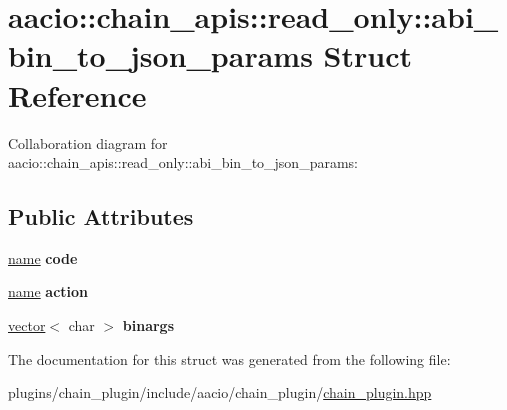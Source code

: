 \hypertarget{structaacio_1_1chain__apis_1_1read__only_1_1abi__bin__to__json__params}{}\section{aacio\+:\+:chain\+\_\+apis\+:\+:read\+\_\+only\+:\+:abi\+\_\+bin\+\_\+to\+\_\+json\+\_\+params Struct Reference}
\label{structaacio_1_1chain__apis_1_1read__only_1_1abi__bin__to__json__params}


Collaboration diagram for aacio\+:\+:chain\+\_\+apis\+:\+:read\+\_\+only\+:\+:abi\+\_\+bin\+\_\+to\+\_\+json\+\_\+params\+:
\subsection*{Public Attributes}
\begin{DoxyCompactItemize}
\item 
\mbox{\label{structaacio_1_1chain__apis_1_1read__only_1_1abi__bin__to__json__params_ab27c716024d1d07d033bdbcd528ec991}} 
\mbox{\hyperlink{structaacio_1_1name}{name}} {\bfseries code}
\item 
\mbox{\label{structaacio_1_1chain__apis_1_1read__only_1_1abi__bin__to__json__params_aaa7dee8fac64d6a3128c6d4ea3a538a6}} 
\mbox{\hyperlink{structaacio_1_1name}{name}} {\bfseries action}
\item 
\mbox{\label{structaacio_1_1chain__apis_1_1read__only_1_1abi__bin__to__json__params_aa17fbe6e9310d1b1d48e6374afce545d}} 
\mbox{\hyperlink{classstd_1_1vector}{vector}}$<$ char $>$ {\bfseries binargs}
\end{DoxyCompactItemize}


The documentation for this struct was generated from the following file\+:\begin{DoxyCompactItemize}
\item 
plugins/chain\+\_\+plugin/include/aacio/chain\+\_\+plugin/\mbox{\hyperlink{chain__plugin_8hpp}{chain\+\_\+plugin.\+hpp}}\end{DoxyCompactItemize}
